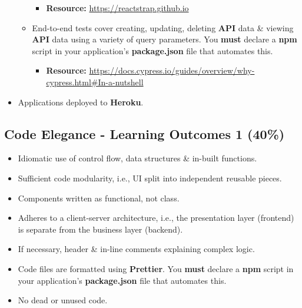 \documentclass{article}
\begin{document}
\begin{itemize}
\begin{itemize}
		\begin{itemize}
			\item \textbf{Resource:} \footnotesize\href{https://reactstrap.github.io}{https://reactstrap.github.io}
		\end{itemize}
		\item End-to-end tests cover creating, updating, deleting \textbf{API} data \& viewing \textbf{API} data using a variety of query parameters. You \textbf{must} declare a \textbf{npm} script in your application's \textbf{package.json} file that automates this.
		\begin{itemize}
			\item \textbf{Resource:} \footnotesize\href{https://docs.cypress.io/guides/overview/why-cypress.html#In-a-nutshell}{https://docs.cypress.io/guides/overview/why-cypress.html\#In-a-nutshell}
		\end{itemize}
	\end{itemize}
	\item Applications deployed to \textbf{Heroku}. 
\end{itemize}

\subsection*{Code Elegance - Learning Outcomes 1 (40\%)}
\begin{itemize}
	\item Idiomatic use of control flow, data structures \& in-built functions.
	\item Sufficient code modularity, i.e., UI split into independent reusable pieces.
	\item Components written as functional, not class.
	\item Adheres to a client-server architecture, i.e., the presentation layer (frontend) is separate from the business layer (backend).
	\item If necessary, header \& in-line comments explaining complex logic.
	\item Code files are formatted using \textbf{Prettier}. You \textbf{must} declare a \textbf{npm} script in your application's \textbf{package.json} file that automates this.
	\item No dead or unused code.
\end{itemize}
\end{document}
